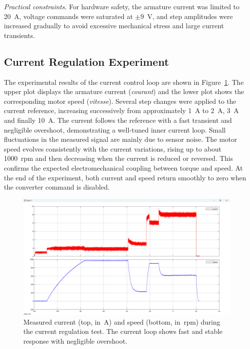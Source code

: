 \documentclass{rapportCS}
\begin{document}
\vspace{4pt}
\noindent\textit{Practical constraints.} For hardware safety, the armature current was limited to 20~A, voltage commands were saturated at $\pm9$~V, and step amplitudes were increased gradually to avoid excessive mechanical stress and large current transients.

\subsection{Current Regulation Experiment}

The experimental results of the current control loop are shown in Figure~\ref{fig:exp_I_20A}. 
The upper plot displays the armature current (\textit{courant}) and the lower plot shows the corresponding motor speed (\textit{vitesse}). 
Several step changes were applied to the current reference, increasing successively from approximately 1~A to 2~A, 3~A and finally 10~A. 
The current follows the reference with a fast transient and negligible overshoot, demonstrating a well-tuned inner current loop. 
Small fluctuations in the measured signal are mainly due to sensor noise. 
The motor speed evolves consistently with the current variations, rising up to about 1000~rpm and then decreasing when the current is reduced or reversed. 
This confirms the expected electromechanical coupling between torque and speed. 
At the end of the experiment, both current and speed return smoothly to zero when the converter command is disabled.

\begin{figure}[H]
    \centering
    \includegraphics[width=\linewidth, keepaspectratio]{figures/PP1.png}
    \caption{Measured current (top, in~A) and speed (bottom, in~rpm) during the current regulation test. 
    The current loop shows fast and stable response with negligible overshoot.}
    \label{fig:exp_I_20A}
\end{figure}
\end{document}
